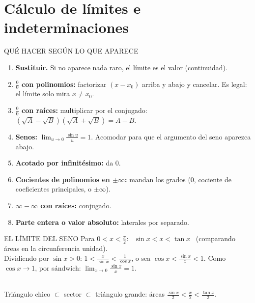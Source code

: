 \section{Cálculo de límites e indeterminaciones}
\agregado
\begin{metodo}{QUÉ HACER SEGÚN LO QUE APARECE}
\begin{enumerate}
\item \textbf{Sustituir.} Si no aparece nada raro, el límite es el valor (continuidad).
\item \textbf{$\frac00$ con polinomios:} factorizar $(x-x_0)$ arriba y abajo y cancelar. Es legal: el límite solo mira $x\neq x_0$.
\item \textbf{$\frac00$ con raíces:} multiplicar por el conjugado: $(\sqrt A-\sqrt B)(\sqrt A+\sqrt B)=A-B$.
\item \textbf{Senos:} $\lim_{u\to0}\frac{\sin u}u=1$. Acomodar para que el argumento del seno aparezca abajo.
\item \textbf{Acotado por infinitésimo:} da 0.
\item \textbf{Cocientes de polinomios en $\pm\infty$:} mandan los grados (0, cociente de coeficientes principales, o $\pm\infty$).
\item \textbf{$\infty-\infty$ con raíces:} conjugado.
\item \textbf{Parte entera o valor absoluto:} laterales por separado.
\end{enumerate}
\end{metodo}
\agregado
\begin{sello}{EL LÍMITE DEL SENO}
Para $0<x<\frac\pi2$: \ $\sin x<x<\tan x$ \ (comparando áreas en la circunferencia unidad).\\[2pt]
Dividiendo por $\sin x>0$: $1<\frac x{\sin x}<\frac1{\cos x}$, o sea $\cos x<\frac{\sin x}x<1$. Como $\cos x\to1$, por sándwich: $\displaystyle\lim_{x\to0}\frac{\sin x}x=1$.
\end{sello}
\begin{center}
\\
{\ttfamily\scriptsize\color{suave} Triángulo chico $\subset$ sector $\subset$ triángulo grande: áreas $\frac{\sin x}2<\frac x2<\frac{\tan x}2$.}
\end{center}
